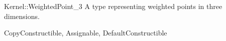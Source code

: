 \begin{ccRefConcept}{Kernel::WeightedPoint_3}
A type representing weighted points in three dimensions.

\ccRefines
CopyConstructible, Assignable, DefaultConstructible

\ccSeeAlso
{} \\
 \\
 \\
 \\

\end{ccRefConcept}
